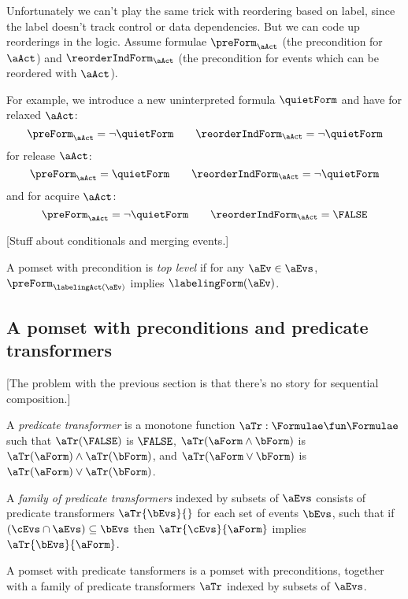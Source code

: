 Unfortunately we can't play the same trick with reordering based on
label, since the label doesn't track control or data dependencies. But
we can code up reorderings in the logic. Assume formulae
$\preForm_\aAct$ (the precondition for $\aAct$) and
$\reorderIndForm_\aAct$ (the precondition for events which can be reordered with $\aAct$).

For example, we introduce a new uninterpreted formula $\quietForm$
and have for relaxed $\aAct$:
\[
  \preForm_{\aAct} = \neg\quietForm
\qquad
  \reorderIndForm_{\aAct} = \neg\quietForm
\]
for release $\aAct$:
\[
  \preForm_{\aAct} = \quietForm
\qquad
  \reorderIndForm_{\aAct} = \neg\quietForm
\]
and for acquire $\aAct$:
\[
  \preForm_{\aAct} = \neg\quietForm
\qquad
  \reorderIndForm_{\aAct} = \FALSE
\]

[Stuff about conditionals and merging events.]

\begin{definition}
  A pomset with precondition is \emph{top level} if for any $\aEv\in\aEvs$,
  $\preForm_{\labelingAct(\aEv)}$ implies $\labelingForm(\aEv)$.
\end{definition}


\subsection{A pomset with preconditions and predicate transformers}

[The problem with the previous section is that there's no story for sequential composition.]

\begin{definition}
  A \emph{predicate transformer} is a monotone function
  $\aTr:\Formulae\fun\Formulae$ such that
  $\aTr(\FALSE)$ is $\FALSE$,
  $\aTr(\aForm\land\bForm)$ is $\aTr(\aForm)\land\aTr(\bForm)$, and
  $\aTr(\aForm\lor\bForm)$ is $\aTr(\aForm)\lor\aTr(\bForm)$.
\end{definition}

\begin{definition}
  A \emph{family of predicate transformers}
  indexed by subsets of $\aEvs$
  consists of predicate transformers
  $\aTr{\bEvs}{}$ for each set of events $\bEvs$,
  such that if $(\cEvs\cap\aEvs) \subseteq \bEvs$
  then $\aTr{\cEvs}{\aForm}$ implies $\aTr{\bEvs}{\aForm}$.
\end{definition}

\begin{definition}
  A pomset with predicate tansformers is a
  pomset with preconditions, together with a family of predicate transformers $\aTr$
  indexed by subsets of $\aEvs$.
\end{definition}

